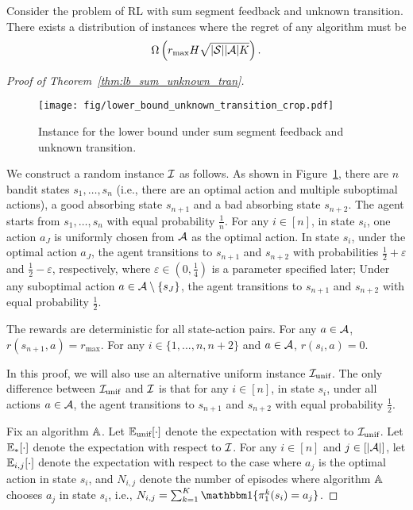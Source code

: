\begin{theorem} \label{thm:lb_sum_unknown_tran}
	Consider the problem of RL with sum segment feedback and unknown transition. There exists a distribution of instances where the regret of any algorithm must be
	\begin{align*}
		\Omega\left( r_{\max} H\sqrt{|\mathcal{S}||\mathcal{A}|K}  \right) .
	\end{align*}
\end{theorem}
\begin{proof}[Proof of Theorem~\ref{thm:lb_sum_unknown_tran}]
	\begin{figure}[t]
		\centering   
		\texttt{[image: fig/lower\_bound\_unknown\_transition\_crop.pdf]}
		\caption{Instance for the lower bound under sum segment feedback and unknown transition.
		} \label{fig:lower_bound_unknown_transition}
	\end{figure}
	
	We construct a random instance $\mathcal{I}$ as follows. As shown in Figure~\ref{fig:lower_bound_unknown_transition}, there are $n$ bandit states $s_1,\dots,s_n$ (i.e., there are an optimal action and multiple suboptimal actions), a good absorbing state $s_{n+1}$ and a bad absorbing state $s_{n+2}$.
	The agent starts from $s_1,\dots,s_n$ with equal probability $\frac{1}{n}$. For any $i \in [n]$, in state $s_i$, one action $a_J$ is uniformly chosen from $\mathcal{A}$ as the optimal action. In state $s_i$, under the optimal action $a_J$, the agent transitions to $s_{n+1}$ and $s_{n+2}$ with probabilities $\frac{1}{2}+\varepsilon$ and $\frac{1}{2}-\varepsilon$, respectively, where $\varepsilon \in (0,\frac{1}{4})$ is a parameter specified later; Under any suboptimal action $a \in \mathcal{A} \setminus \{s_J\}$, the agent transitions to $s_{n+1}$ and $s_{n+2}$ with equal probability $\frac{1}{2}$.
	
	The rewards are deterministic for all state-action pairs. 
	For any $a \in \mathcal{A}$, $r(s_{n+1},a)=r_{\max}$. For any $i\in \{1,...,n,n+2\}$ and $a \in \mathcal{A}$, $r(s_i,a)=0$.
	
	
	In this proof, we will also use an alternative uniform instance $\mathcal{I}_{\textup{unif}}$. The only difference between $\mathcal{I}_{\textup{unif}}$ and $\mathcal{I}$ is that for any $i \in [n]$, in state $s_i$, under all actions $a \in \mathcal{A}$, the agent transitions to $s_{n+1}$ and $s_{n+2}$ with equal probability $\frac{1}{2}$.
	
	Fix an algorithm $\mathbb{A}$.
	Let $\mathbb{E}_{\textup{unif}}[\cdot]$ denote the expectation with respect to $\mathcal{I}_{\textup{unif}}$. Let $\mathbb{E}_*[\cdot]$ denote the expectation with respect to $\mathcal{I}$. For any $i \in [n]$ and $j \in [|\mathcal{A}|]$, let $\mathbb{E}_{i,j}[\cdot]$ denote the expectation with respect to the case where $a_j$ is the optimal action in state $s_i$, and  $N_{i,j}$ denote the number of episodes where algorithm $\mathbb{A}$ chooses $a_j$ in state $s_i$, i.e., $N_{i,j}=\sum_{k=1}^{K} \indicator\{\pi^k_1(s_i)=a_j\}$. 
	

\end{proof}
